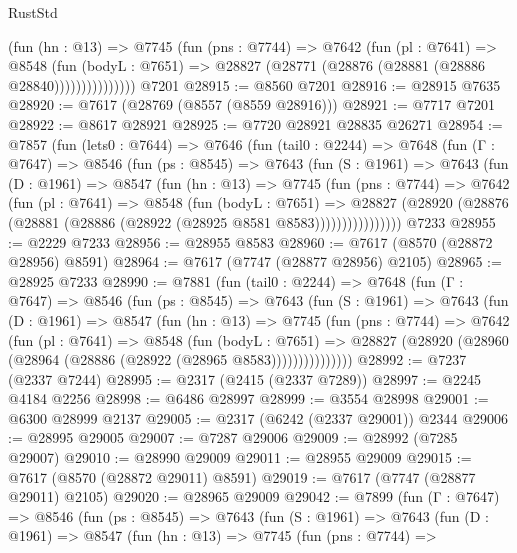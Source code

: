 \begin{lexlean}{RustStd}
\begin{coremodule}
                  (fun (hn : @13) =>
                  @7745
                    (fun (pns : @7744) =>
                    @7642
                      (fun (pl : @7641) =>
                      @8548
                        (fun (bodyL : @7651) =>
                        @28827 (@28771 (@28876 (@28881 (@28886 @28840)))))))))))))))
    @7201
@28915 := @8560 @7201
@28916 := @28915 @7635
@28920 := @7617 (@28769 (@8557 (@8559 @28916)))
@28921 := @7717 @7201
@28922 := @8617 @28921
@28925 := @7720 @28921 @28835 @26271
@28954 := @7857
    (fun (lets0 : @7644) =>
    @7646
      (fun (tail0 : @2244) =>
      @7648
        (fun (Γ : @7647) =>
        @8546
          (fun (ps : @8545) =>
          @7643
            (fun (S : @1961) =>
            @7643
              (fun (D : @1961) =>
              @8547
                (fun (hn : @13) =>
                @7745
                  (fun (pns : @7744) =>
                  @7642
                    (fun (pl : @7641) =>
                    @8548
                      (fun (bodyL : @7651) =>
                      @28827
                        (@28920 (@28876 (@28881 (@28886 (@28922 (@28925 @8581 @8583))))))))))))))))
    @7233
@28955 := @2229 @7233
@28956 := @28955 @8583
@28960 := @7617 (@8570 (@28872 @28956) @8591)
@28964 := @7617 (@7747 (@28877 @28956) @2105)
@28965 := @28925 @7233
@28990 := @7881
    (fun (tail0 : @2244) =>
    @7648
      (fun (Γ : @7647) =>
      @8546
        (fun (ps : @8545) =>
        @7643
          (fun (S : @1961) =>
          @7643
            (fun (D : @1961) =>
            @8547
              (fun (hn : @13) =>
              @7745
                (fun (pns : @7744) =>
                @7642
                  (fun (pl : @7641) =>
                  @8548
                    (fun (bodyL : @7651) =>
                    @28827 (@28920 (@28960 (@28964 (@28886 (@28922 (@28965 @8583)))))))))))))))
@28992 := @7237 (@2337 @7244)
@28995 := @2317 (@2415 (@2337 @7289))
@28997 := @2245 @4184 @2256
@28998 := @6486 @28997
@28999 := @3554 @28998
@29001 := @6300 @28999 @2137
@29005 := @2317 (@6242 (@2337 @29001)) @2344
@29006 := @28995 @29005
@29007 := @7287 @29006
@29009 := @28992 (@7285 @29007)
@29010 := @28990 @29009
@29011 := @28955 @29009
@29015 := @7617 (@8570 (@28872 @29011) @8591)
@29019 := @7617 (@7747 (@28877 @29011) @2105)
@29020 := @28965 @29009
@29042 := @7899
    (fun (Γ : @7647) =>
    @8546
      (fun (ps : @8545) =>
      @7643
        (fun (S : @1961) =>
        @7643
          (fun (D : @1961) =>
          @8547
            (fun (hn : @13) =>
            @7745
              (fun (pns : @7744) =>

\end{coremodule}
\end{lexlean}
